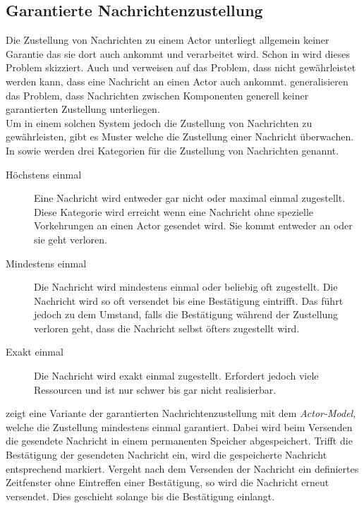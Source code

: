\subsection{Garantierte Nachrichtenzustellung}
\label{sec:actor:patterns:guaranteedDelivery}
Die Zustellung von Nachrichten zu einem Actor unterliegt allgemein keiner Garantie das sie dort auch ankommt und verarbeitet wird. Schon in \cite{Agha1985ConcurrentParallelism} wird dieses Problem skizziert. Auch \cite{Vernon2015ReactiveAkka} und \cite{CloudComputingPatterns2014} verweisen auf das Problem, dass nicht gewährleistet werden kann, dass eine Nachricht an einen Actor auch ankommt. \cite{CloudComputingPatterns2014} generalisieren das Problem, dass Nachrichten zwischen Komponenten generell keiner garantierten Zustellung unterliegen. \\
Um in einem solchen System jedoch die Zustellung von Nachrichten zu gewährleisten, gibt es Muster welche die Zustellung einer Nachricht überwachen. In \cite{messagedeliveryreliabilityakkadocumentation} sowie \cite{kuhn2017reactive} werden drei Kategorien für die Zustellung von Nachrichten genannt.
\begin{description}
  \item [Höchstens einmal] Eine Nachricht wird entweder gar nicht oder maximal einmal zugestellt. Diese Kategorie wird erreicht wenn eine Nachricht ohne spezielle Vorkehrungen an einen Actor gesendet wird. Sie kommt entweder an oder sie geht verloren.
  \item [Mindestens einmal] Die Nachricht wird mindestens einmal oder beliebig oft zugestellt. Die Nachricht wird so oft versendet bis eine Bestätigung eintrifft. Das führt jedoch zu dem Umstand, falls die Bestätigung während der Zustellung verloren geht, dass die Nachricht selbst öfters zugestellt wird.
  \item [Exakt einmal] Die Nachricht wird exakt einmal zugestellt. Erfordert jedoch viele Ressourcen und ist nur schwer bis gar nicht realisierbar.
\end{description}
\cite{Vernon2015ReactiveAkka} zeigt eine Variante der garantierten Nachrichtenzustellung mit dem \textit{Actor-Model}, welche die Zustellung mindestens einmal garantiert. Dabei wird beim Versenden die gesendete Nachricht in einem permanenten Speicher abgespeichert. Trifft die Bestätigung der gesendeten Nachricht ein, wird die gespeicherte Nachricht entsprechend markiert. Vergeht nach dem Versenden der Nachricht ein definiertes Zeitfenster ohne Eintreffen einer Bestätigung, so wird die Nachricht erneut versendet. Dies geschieht solange bis die Bestätigung einlangt. \\
